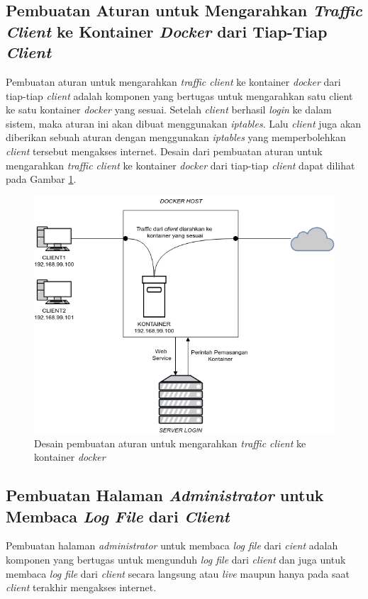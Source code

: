    	\subsection{Pembuatan Aturan untuk Mengarahkan \textit{Traffic Client} ke Kontainer \textit{Docker} dari Tiap-Tiap \textit{Client}}
   	Pembuatan aturan untuk mengarahkan \textit{traffic client} ke kontainer \textit{docker} dari tiap-tiap \textit{client} adalah komponen yang bertugas untuk mengarahkan satu client ke satu kontainer \textit{docker} yang sesuai. Setelah \textit{client} berhasil \textit{login} ke dalam sistem, maka aturan ini akan dibuat menggunakan \textit{iptables}. Lalu \textit{client} juga akan diberikan sebuah aturan dengan menggunakan \textit{iptables} yang memperbolehkan \textit{client} tersebut mengakses internet. Desain dari pembuatan aturan untuk mengarahkan \textit{traffic client} ke kontainer \textit{docker} dari tiap-tiap \textit{client} dapat dilihat pada Gambar \ref{mengarahkankontainerdocker}.
   	
	\begin{figure}[H]
		\centering
		\includegraphics[width=\linewidth]{images/bab3/DIAGRAM3}
		\caption{Desain pembuatan aturan untuk mengarahkan \textit{traffic client} ke kontainer \textit{docker}}
		\label{mengarahkankontainerdocker}
	\end{figure}
	
	\subsection{Pembuatan Halaman \textit{Administrator} untuk Membaca \textit{Log File} dari \textit{Client}}
	Pembuatan halaman \textit{administrator} untuk membaca \textit{log file} dari \textit{cient} adalah komponen yang bertugas untuk mengunduh \textit{log file} dari \textit{client} dan juga untuk membaca \textit{log file} dari \textit{client} secara langsung atau \textit{live} maupun hanya pada saat \textit{client} terakhir mengakses internet.
	
